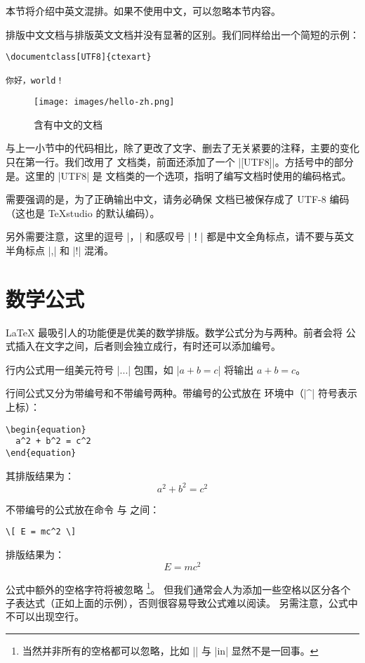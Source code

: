本节将介绍中英文混排。如果不使用中文，可以忽略本节内容。

排版中文文档与排版英文文档并没有显著的区别。我们同样给出一个简短的示例：

\begin{verbatim}
\documentclass[UTF8]{ctexart}

你好，world！

\end{verbatim}

\begin{figure}[htb]
  \texttt{[image: images/hello-zh.png]}
  \caption{含有中文的文档 }
  \label{fig:hello-zh}
\end{figure}

与上一小节中的代码相比，除了更改了文字、删去了无关紧要的注释，主要的变化只在第一行。我们改用了
 文档类，前面还添加了一个 |[UTF8]|。方括号中的部分是。这里的 |UTF8| 是
 文档类的一个选项，指明了编写文档时使用的编码格式。

需要强调的是，为了正确输出中文，请务必确保  文档已被保存成了 UTF-8 编码（这也是
TeXstudio 的默认编码）。

另外需要注意，这里的逗号 |，| 和感叹号 |！| 都是中文全角标点，请不要与英文半角标点 |,| 和 |!| 混淆。

\section{数学公式}

\LaTeX{} 最吸引人的功能便是优美的数学排版。数学公式分为与两种。前者会将
公式插入在文字之间，后者则会独立成行，有时还可以添加编号。

行内公式用一组美元符号 |$...$| 包围，如 |$a+b=c$| 将输出 $a+b=c$。

行间公式又分为带编号和不带编号两种。带编号的公式放在  环境中（|^| 符号表示上标）：

\begin{verbatim}
\begin{equation}
  a^2 + b^2 = c^2
\end{equation}
\end{verbatim}

其排版结果为：
\begin{equation}
  a^2 + b^2 = c^2
\end{equation}

不带编号的公式放在命令 \cs{[} 与 \cs{]}之间：

\begin{verbatim}
\[ E = mc^2 \]
\end{verbatim}

排版结果为：
\[ E = mc^2 \]

公式中额外的空格字符将被忽略
\footnote{当然并非所有的空格都可以忽略，比如 |\sin| 与 |\s in| 显然不是一回事。}。
但我们通常会人为添加一些空格以区分各个子表达式（正如上面的示例），否则很容易导致公式难以阅读。
另需注意，公式中不可以出现空行。
